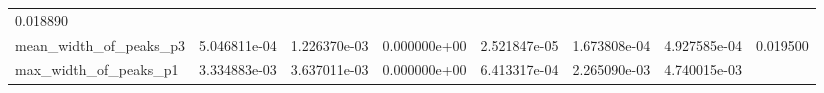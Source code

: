 \documentclass[11pt]{article}
\begin{document}
\begin{longtable}[]{@{}llllllll@{}}
\begin{minipage}[t]{0.08\columnwidth}
0.018890\strut
\end{minipage}\tabularnewline
\begin{minipage}[t]{0.16\columnwidth}\raggedright
mean\_width\_of\_peaks\_p3\strut
\end{minipage} & \begin{minipage}[t]{0.09\columnwidth}\raggedright
5.046811e-04\strut
\end{minipage} & \begin{minipage}[t]{0.09\columnwidth}\raggedright
1.226370e-03\strut
\end{minipage} & \begin{minipage}[t]{0.09\columnwidth}\raggedright
0.000000e+00\strut
\end{minipage} & \begin{minipage}[t]{0.09\columnwidth}\raggedright
2.521847e-05\strut
\end{minipage} & \begin{minipage}[t]{0.09\columnwidth}\raggedright
1.673808e-04\strut
\end{minipage} & \begin{minipage}[t]{0.09\columnwidth}\raggedright
4.927585e-04\strut
\end{minipage} & \begin{minipage}[t]{0.08\columnwidth}\raggedright
0.019500\strut
\end{minipage}\tabularnewline
\begin{minipage}[t]{0.16\columnwidth}\raggedright
max\_width\_of\_peaks\_p1\strut
\end{minipage} & \begin{minipage}[t]{0.09\columnwidth}\raggedright
3.334883e-03\strut
\end{minipage} & \begin{minipage}[t]{0.09\columnwidth}\raggedright
3.637011e-03\strut
\end{minipage} & \begin{minipage}[t]{0.09\columnwidth}\raggedright
0.000000e+00\strut
\end{minipage} & \begin{minipage}[t]{0.09\columnwidth}\raggedright
6.413317e-04\strut
\end{minipage} & \begin{minipage}[t]{0.09\columnwidth}\raggedright
2.265090e-03\strut
\end{minipage} & \begin{minipage}[t]{0.09\columnwidth}\raggedright
4.740015e-03\strut
\end{minipage} & \begin{minipage}[t]{0.08\columnwidth}\raggedright

\end{minipage}
\end{longtable}
\end{document}
